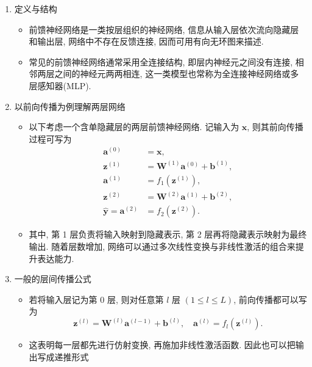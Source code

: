 \documentclass{../nndlcourse}
\begin{document}
\begin{enumerate}
    \item 定义与结构
    \begin{itemize}
        \item 前馈神经网络是一类按层组织的神经网络, 信息从输入层依次流向隐藏层和输出层, 网络中不存在反馈连接, 因而可用有向无环图来描述. 
        \item 常见的前馈神经网络通常采用全连接结构, 即层内神经元之间没有连接, 相邻两层之间的神经元两两相连, 这一类模型也常称为全连接神经网络或多层感知器(MLP). 
    \end{itemize}
    \item 以前向传播为例理解两层网络
    \begin{itemize}
        \item 以下考虑一个含单隐藏层的两层前馈神经网络. 记输入为 $\boldsymbol{x}$, 则其前向传播过程可写为
        \begin{align*}
            \boldsymbol{a}^{(0)} &= \boldsymbol{x}, \\
            \boldsymbol{z}^{(1)} &= \boldsymbol{W}^{(1)} \boldsymbol{a}^{(0)} + \boldsymbol{b}^{(1)}, \\
            \boldsymbol{a}^{(1)} &= f_1\left(\boldsymbol{z}^{(1)}\right), \\
            \boldsymbol{z}^{(2)} &= \boldsymbol{W}^{(2)} \boldsymbol{a}^{(1)} + \boldsymbol{b}^{(2)}, \\
            \hat{\boldsymbol{y}} = \boldsymbol{a}^{(2)} &= f_2\left(\boldsymbol{z}^{(2)}\right).
        \end{align*}
        \item 其中, 第 1 层负责将输入映射到隐藏表示, 第 2 层再将隐藏表示映射为最终输出. 随着层数增加, 网络可以通过多次线性变换与非线性激活的组合来提升表达能力. 
    \end{itemize}
    \item 一般的层间传播公式
    \begin{itemize}
        \item 若将输入层记为第 $0$ 层, 则对任意第 $l$ 层 $(1 \le l \le L)$, 前向传播都可以写为
        \begin{equation*}
            \boldsymbol{z}^{(l)} = \boldsymbol{W}^{(l)} \boldsymbol{a}^{(l-1)} + \boldsymbol{b}^{(l)}, \quad
            \boldsymbol{a}^{(l)} = f_l\left(\boldsymbol{z}^{(l)}\right).
        \end{equation*}
        \item 这表明每一层都先进行仿射变换, 再施加非线性激活函数. 因此也可以把输出写成递推形式
        \begin{equation*}

\end{equation*}
\end{itemize}
\end{enumerate}
\end{document}
